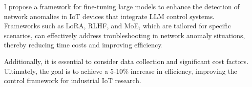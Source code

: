\documentclass[usenatbib]{tjaa}
\begin{document}
I propose a framework for fine-tuning large models to
enhance the detection of network anomalies in IoT devices
that integrate LLM control systems. Frameworks such as LoRA,
RLHF, and MoE, which are tailored for specific scenarios,
can effectively address troubleshooting in network anomaly
situations, thereby reducing time costs and improving efficiency.

Additionally, it is essential to consider data collection and
significant cost factors. Ultimately, the goal is to achieve a
5-10\% increase in efficiency, improving the control framework
for industrial IoT research.





\end{document}
